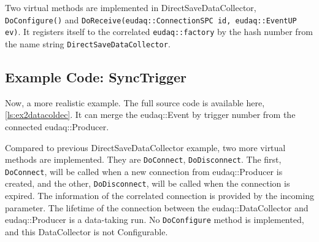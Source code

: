 Two virtual methods are implemented in DirectSaveDataCollector, \lstinline[style=cpp]{DoConfigure()} and \lstinline[style=cpp]{DoReceive(eudaq::ConnectionSPC id, eudaq::EventUP ev)}. It registers itself to the correlated \lstinline[style=cpp]{eudaq::factory} by the hash number from the name string \lstinline[style=cpp]{DirectSaveDataCollector}. 

\subsection{Example Code: SyncTrigger}\label{sec:ex2datacollector_cc}
Now, a more realistic example. The full source code is available here, \autoref{ls:ex2datacoldec}. It can merge the eudaq::Event by trigger number from the connected eudaq::Producer.

Compared to previous DirectSaveDataCollector example, two more virtual methods are implemented. They are \lstinline[style=cpp]{DoConnect}, \lstinline[style=cpp]{DoDisconnect}. The first, \lstinline[style=cpp]{DoConnect}, will be called when a new connection from eudaq::Producer is created, and the other, \lstinline[style=cpp]{DoDisconnect}, will be called  when the connection is expired. The information of the correlated connection is provided by the incoming parameter. The lifetime of the connection between the eudaq::DataCollector and eudaq::Producer is a data-taking run. No \lstinline[style=cpp]{DoConfigure} method is implemented, and this DataCollector is not Configurable.










